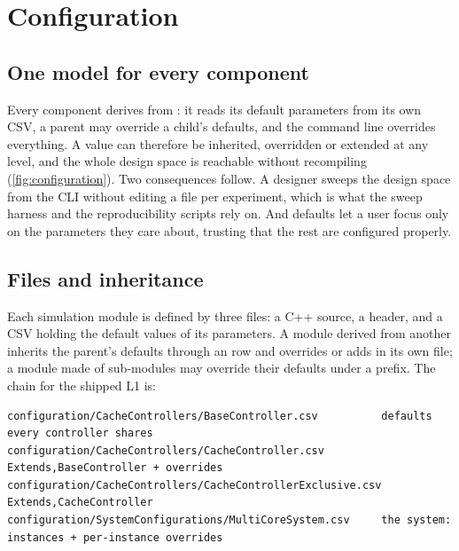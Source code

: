 \chapter{Configuration}\label{ch:configuration}


\section{One model for every component}

Every component derives from : it reads its default parameters from its own
CSV, a parent may override a child's defaults, and the command line overrides everything. A
value can therefore be inherited, overridden or extended at any level, and the whole design
space is reachable without recompiling (\cref{fig:configuration}). Two consequences follow. A
designer sweeps the design space from the CLI without editing a file per experiment, which is
what the sweep harness and the reproducibility scripts rely on. And defaults let a user focus
only on the parameters they care about, trusting that the rest are configured properly.


\section{Files and inheritance}

Each simulation module is defined by three files: a C++ source, a header, and a CSV holding the
default values of its parameters. A module derived from another inherits the parent's defaults
through an  row and overrides or adds in its own file; a module made of
sub-modules may override their defaults under a prefix. The chain for the shipped L1 is:

\begin{lstlisting}[style=plain]
configuration/CacheControllers/BaseController.csv          defaults every controller shares
configuration/CacheControllers/CacheController.csv         Extends,BaseController + overrides
configuration/CacheControllers/CacheControllerExclusive.csv Extends,CacheController
configuration/SystemConfigurations/MultiCoreSystem.csv     the system: instances + per-instance overrides
\end{lstlisting}

